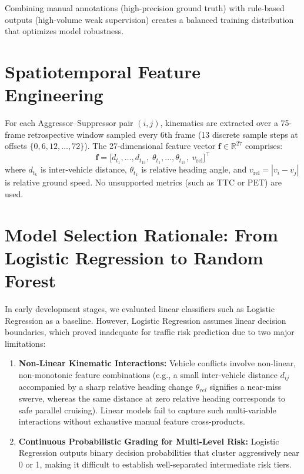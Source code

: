 Combining manual annotations (high-precision ground truth) with rule-based outputs (high-volume weak supervision) creates a balanced training distribution that optimizes model robustness.

\section{Spatiotemporal Feature Engineering}

For each Aggressor--Suppressor pair $(i, j)$, kinematics are extracted over a 75-frame retrospective window sampled every 6th frame (13 discrete sample steps at offsets $\{0, 6, 12, \ldots, 72\}$). The 27-dimensional feature vector $\mathbf{f} \in \mathbb{R}^{27}$ comprises:
\begin{equation}
    \mathbf{f} = \bigl[d_{t_1}, \ldots, d_{t_{13}},\;\theta_{t_1}, \ldots, \theta_{t_{13}},\;v_{\text{rel}}\bigr]^\top
\end{equation}
where $d_{t_k}$ is inter-vehicle distance, $\theta_{t_k}$ is relative heading angle, and $v_{\text{rel}} = |v_i - v_j|$ is relative ground speed. No unsupported metrics (such as TTC or PET) are used.

\section{Model Selection Rationale: From Logistic Regression to Random Forest}

In early development stages, we evaluated linear classifiers such as Logistic Regression as a baseline. However, Logistic Regression assumes linear decision boundaries, which proved inadequate for traffic risk prediction due to two major limitations:
\begin{enumerate}
    \item \textbf{Non-Linear Kinematic Interactions:} Vehicle conflicts involve non-linear, non-monotonic feature combinations (e.g., a small inter-vehicle distance $d_{ij}$ accompanied by a sharp relative heading change $\theta_{rel}$ signifies a near-miss swerve, whereas the same distance at zero relative heading corresponds to safe parallel cruising). Linear models fail to capture such multi-variable interactions without exhaustive manual feature cross-products.
    \item \textbf{Continuous Probabilistic Grading for Multi-Level Risk:} Logistic Regression outputs binary decision probabilities that cluster aggressively near 0 or 1, making it difficult to establish well-separated intermediate risk tiers.
\end{enumerate}

